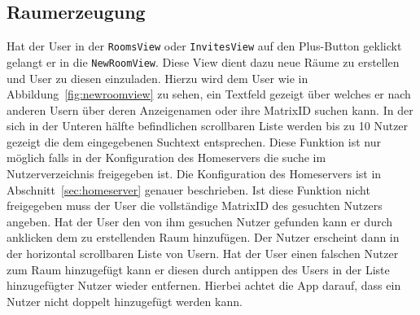     \newpage
    \subsection{Raumerzeugung}\label{subsec:raumerzeugung}
    Hat der User in der \texttt{RoomsView} oder \texttt{InvitesView} auf den Plus-Button geklickt gelangt er in die \texttt{NewRoomView}.
    Diese View dient dazu neue Räume zu erstellen und User zu diesen einzuladen.
    Hierzu wird dem User wie in Abbildung~\ref{fig:newroomview} zu sehen, ein Textfeld gezeigt über welches er nach anderen Usern über deren Anzeigenamen oder ihre MatrixID suchen kann.
    In der sich in der Unteren hälfte befindlichen scrollbaren Liste werden bis zu 10 Nutzer gezeigt die dem eingegebenen Suchtext entsprechen.
    Diese Funktion ist nur möglich falls in der Konfiguration des Homeservers die suche im Nutzerverzeichnis freigegeben ist.
    Die Konfiguration des Homeservers ist in Abschnitt~\ref{sec:homeserver} genauer beschrieben.
    Ist diese Funktion nicht freigegeben muss der User die vollständige MatrixID des gesuchten Nutzers angeben.
    Hat der User den von ihm gesuchen Nutzer gefunden kann er durch anklicken dem zu erstellenden Raum hinzufügen.
    Der Nutzer erscheint dann in der horizontal scrollbaren Liste von Usern.
    Hat der User einen falschen Nutzer zum Raum hinzugefügt kann er diesen durch antippen des Users in der Liste hinzugefügter Nutzer wieder entfernen.
    Hierbei achtet die App darauf, dass ein Nutzer nicht doppelt hinzugefügt werden kann.

